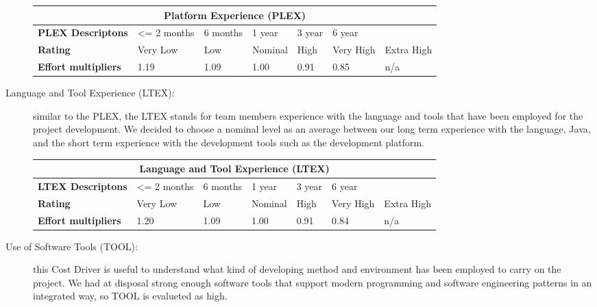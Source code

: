 \begin{description}
\begin{tabular}{|p{}|p{}|p{}|p{}|p{}|p{}|p{}|}
\hline
         \multicolumn{7}{|c|}{\textbf{Platform Experience (PLEX)}} \\ \hline  \hline
         	\textbf{PLEX Descriptons} & <= 2 months & 6 months &1 year & 3 year& 6 year&\\ \hline
	\textbf{Rating}&Very Low & Low & Nominal  & High & Very High &Extra High\\ \hline
	\textbf{Effort multipliers} & 1.19 & 1.09 & 1.00 & 0.91 & 0.85 & n/a \\ \hline
\end{tabular}

\item[Language and Tool Experience (LTEX):] similar to the PLEX, the LTEX stands for team members experience with the language and tools that have been employed for the project development. We decided to choose a nominal level as an average between our long term experience with the language, Java, and the short term experience with the development tools such as the development platform.

\begin{tabular}{|p{}|p{}|p{}|p{}|p{}|p{}|p{}|}
\hline
         \multicolumn{7}{|c|}{\textbf{Language and Tool Experience (LTEX)}} \\ \hline  \hline
         	\textbf{LTEX Descriptons} & <= 2 months & 6 months &1 year & 3 year& 6 year&\\ \hline
	\textbf{Rating}&Very Low & Low & Nominal  & High & Very High &Extra High\\ \hline
	\textbf{Effort multipliers} & 1.20 & 1.09 & 1.00 & 0.91 & 0.84 & n/a \\ \hline
\end{tabular}

\item[Use of Software Tools (TOOL):] this Cost Driver is useful to understand what kind of developing method and environment has been employed to carry on the project. We had at disposal strong enough software tools that support modern programming and software engineering patterns in an integrated way, so TOOL is evalueted as high.


\end{description}
